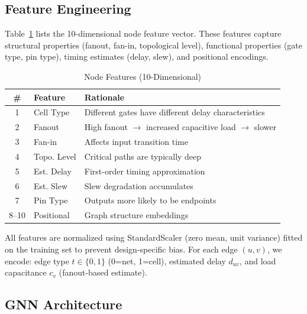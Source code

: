 \documentclass[10pt,twocolumn,journal]{IEEEtran}
\begin{document}
\subsection{Feature Engineering}
\label{sec:features}

Table~\ref{tab:features} lists the 10-dimensional node feature vector. These features capture structural properties (fanout, fan-in, topological level), functional properties (gate type, pin type), timing estimates (delay, slew), and positional encodings.

\begin{table}[t]
\centering
\caption{Node Features (10-Dimensional)}
\label{tab:features}
\begin{tabular}{@{}clp{4.5cm}@{}}
\toprule
\textbf{\#} & \textbf{Feature} & \textbf{Rationale} \\
\midrule
1 & Cell Type & Different gates have different delay characteristics \\
2 & Fanout & High fanout $\rightarrow$ increased capacitive load $\rightarrow$ slower \\
3 & Fan-in & Affects input transition time \\
4 & Topo. Level & Critical paths are typically deep \\
5 & Est. Delay & First-order timing approximation \\
6 & Est. Slew & Slew degradation accumulates \\
7 & Pin Type & Outputs more likely to be endpoints \\
8--10 & Positional & Graph structure embeddings \\
\bottomrule
\end{tabular}
\end{table}

All features are normalized using StandardScaler (zero mean, unit variance) fitted on the training set to prevent design-specific bias. For each edge $(u,v)$, we encode: edge type $t \in \{0, 1\}$ (0=net, 1=cell), estimated delay $d_{uv}$, and load capacitance $c_v$ (fanout-based estimate).

\subsection{GNN Architecture}
\end{document}
